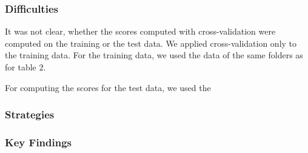 \subsubsection*{Difficulties}
It was not clear, whether the scores computed with cross-validation were computed on the training or the test data. We applied cross-validation only to the training data. For the training data, we used the data of the same folders as for table $2$. 

For computing the scores for the test data, we used the 



\subsubsection*{Strategies}

\subsubsection*{Key Findings}